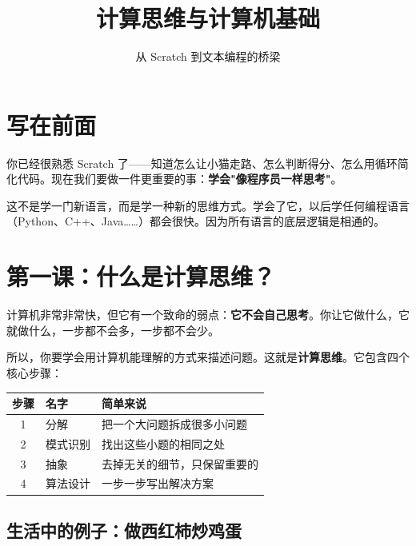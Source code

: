 \documentclass[a4paper,12pt]{ctexart}
\title{\textcolor{blue!70!black}{\Huge\textbf{计算思维与计算机基础}}}
\author{从 Scratch 到文本编程的桥梁}
\date{}
\begin{document}
\maketitle
\thispagestyle{empty}

\section*{写在前面}

你已经很熟悉 Scratch 了——知道怎么让小猫走路、怎么判断得分、怎么用循环简化代码。现在我们要做一件更重要的事：\textbf{学会"像程序员一样思考"}。

这不是学一门新语言，而是学一种新的思维方式。学会了它，以后学任何编程语言（Python、C++、Java……）都会很快。因为所有语言的底层逻辑是相通的。

\section*{第一课：什么是计算思维？}

计算机非常非常快，但它有一个致命的弱点：\textbf{它不会自己思考}。你让它做什么，它就做什么，一步都不会多，一步都不会少。

所以，你要学会用计算机能理解的方式来描述问题。这就是\textbf{计算思维}。它包含四个核心步骤：

\begin{center}
\begin{tabular}{|c|l|l|}
\hline
\textbf{步骤} & \textbf{名字} & \textbf{简单来说} \\ \hline
1 & 分解 & 把一个大问题拆成很多小问题 \\ \hline
2 & 模式识别 & 找出这些小题的相同之处 \\ \hline
3 & 抽象 & 去掉无关的细节，只保留重要的 \\ \hline
4 & 算法设计 & 一步一步写出解决方案 \\ \hline
\end{tabular}
\end{center}

\subsection*{生活中的例子：做西红柿炒鸡蛋}
\end{document}
